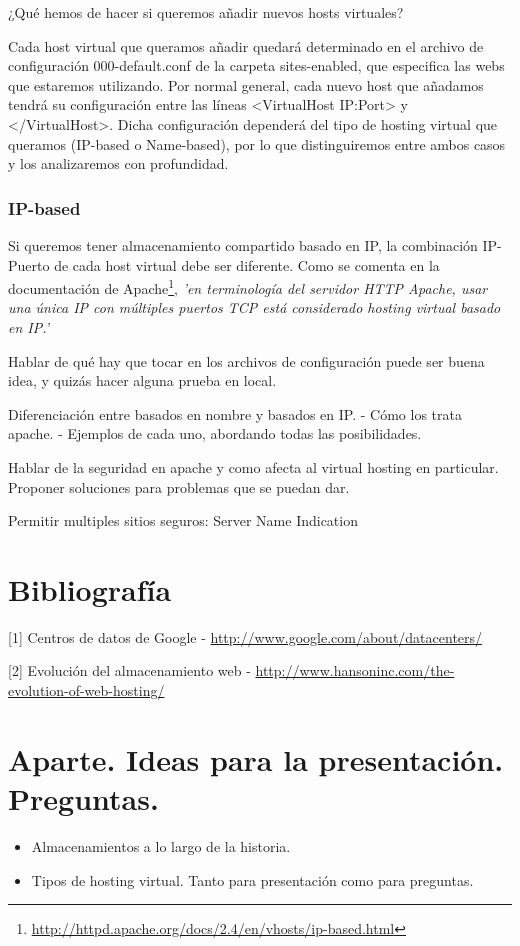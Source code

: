 \documentclass[a4paper, 10pt]{article} %
\begin{document}
¿Qué hemos de hacer si queremos añadir nuevos hosts virtuales? 

Cada host virtual que queramos añadir quedará determinado en el archivo de configuración 000-default.conf de la carpeta sites-enabled, que especifica las webs que estaremos utilizando. Por normal general, cada nuevo host que añadamos tendrá su configuración entre las líneas <VirtualHost IP:Port> y </VirtualHost>. Dicha configuración dependerá del tipo de hosting virtual que queramos (IP-based o Name-based), por lo que distinguiremos entre ambos casos y los analizaremos con profundidad. 

\subsubsection{IP-based}

Si queremos tener almacenamiento compartido basado en IP, la combinación IP-Puerto de cada host virtual debe ser diferente. Como se comenta en la documentación de Apache\footnote{\url{http://httpd.apache.org/docs/2.4/en/vhosts/ip-based.html}}, \textit{'en terminología del servidor HTTP Apache, usar una única IP con múltiples puertos TCP está considerado hosting virtual basado en IP.'}

Hablar de qué hay que tocar en los archivos de configuración puede ser buena idea, y quizás hacer alguna prueba en local. 

Diferenciación entre basados en nombre y basados en IP. 
	- Cómo los trata apache. 
	- Ejemplos de cada uno, abordando todas las posibilidades. 

Hablar de la seguridad en apache y como afecta al virtual hosting en particular. Proponer soluciones para problemas que se puedan dar. 

Permitir multiples sitios seguros: Server Name Indication 

\section{Bibliografía}

[1] Centros de datos de Google - \url{http://www.google.com/about/datacenters/}

[2] Evolución del almacenamiento web - \url{http://www.hansoninc.com/the-evolution-of-web-hosting/}

\section{Aparte. Ideas para la presentación. Preguntas.}
\begin{itemize}
\item Almacenamientos a lo largo de la historia. 
\item Tipos de hosting virtual. Tanto para presentación como para preguntas. 
\end{itemize}
\end{document}
